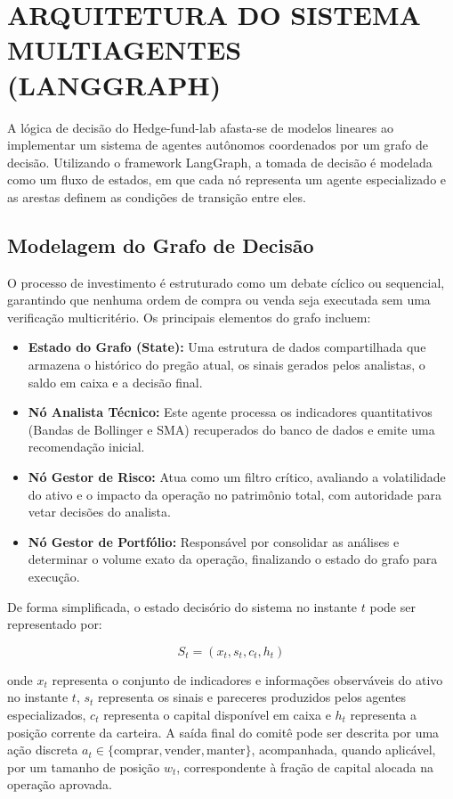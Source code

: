 \documentclass{eic-bcc-tcc}
\begin{document}
\section{ARQUITETURA DO SISTEMA MULTIAGENTES (LANGGRAPH)}

A lógica de decisão do Hedge-fund-lab afasta-se de modelos lineares ao implementar um sistema de agentes autônomos coordenados por um grafo de decisão. Utilizando o framework LangGraph, a tomada de decisão é modelada como um fluxo de estados, em que cada nó representa um agente especializado e as arestas definem as condições de transição entre eles.

\subsection{Modelagem do Grafo de Decisão}

O processo de investimento é estruturado como um debate cíclico ou sequencial, garantindo que nenhuma ordem de compra ou venda seja executada sem uma verificação multicritério. Os principais elementos do grafo incluem:

\begin{itemize}
    \item \textbf{Estado do Grafo (State):} Uma estrutura de dados compartilhada que armazena o histórico do pregão atual, os sinais gerados pelos analistas, o saldo em caixa e a decisão final.
    \item \textbf{Nó Analista Técnico:} Este agente processa os indicadores quantitativos (Bandas de Bollinger e SMA) recuperados do banco de dados e emite uma recomendação inicial.
    \item \textbf{Nó Gestor de Risco:} Atua como um filtro crítico, avaliando a volatilidade do ativo e o impacto da operação no patrimônio total, com autoridade para vetar decisões do analista.
    \item \textbf{Nó Gestor de Portfólio:} Responsável por consolidar as análises e determinar o volume exato da operação, finalizando o estado do grafo para execução.
\end{itemize}

De forma simplificada, o estado decisório do sistema no instante \(t\) pode ser representado por:

\begin{equation}
S_t = (x_t, s_t, c_t, h_t)
\end{equation}

onde \(x_t\) representa o conjunto de indicadores e informações observáveis do ativo no instante \(t\), \(s_t\) representa os sinais e pareceres produzidos pelos agentes especializados, \(c_t\) representa o capital disponível em caixa e \(h_t\) representa a posição corrente da carteira. A saída final do comitê pode ser descrita por uma ação discreta
\(a_t \in \{\text{comprar}, \text{vender}, \text{manter}\}\), acompanhada, quando aplicável, por um tamanho de posição \(w_t\), correspondente à fração de capital alocada na operação aprovada.
\end{document}

